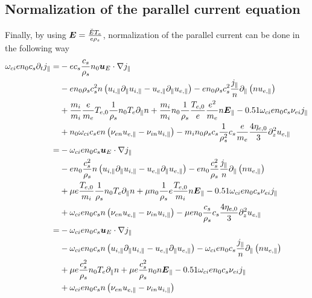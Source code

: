 \subsection{Normalization of the parallel current equation}
%
Finally, by using $\boldsymbol{E}=\frac{\breve{E}T_e}{e\rho_s}$, normalization of the parallel current can be done in the following way
%
\begin{align*}
 \om_{ci}en_0c_s
 \partial_t j_\|
 =&
 - e c_s \frac{c_s}{\rho_s}n_0
    \ve{u}_E \cdot \nabla j_\|
    \\&
    - e n_0\rho_s c_s^2
    n \L( u_{i, \|}  \partial_\| u_{i,\|} - u_{e, \|} \partial_\| u_{e,\|} \R)
    - e n_0\rho_s c_s^2
    \frac{j_\|}{n}\partial_\|\L(n u_{e,\|} \R)
    \\&
    + \frac{m_i}{m_i} \frac{e}{m_e}T_{e,0}\frac{1}{\rho_s}n_0
    T_e\partial_\| n
    + \frac{m_i}{m_i}n_0 \frac{1}{\rho_s}\frac{T_{e,0}}{e}\frac{e^2}{m_e}
    n\ve{E}_\|
    - 0.51 \om_{ci}en_0c_s
    \nu_{ei} j_\|
    \\ &
    + n_0\om_{ci}c_s e
    n \L(\nu_{e n}u_{e,\|}-\nu_{i n}u_{i,\|} \R)
    - m_in_0\rho_s c_s\frac{1}{\rho_s^2}c_s
    \frac{e}{m_e} \frac{4\eta_{e,0}}{3} \partial_z^2 u_{e,\|}
 \\
 =&
 - \om_{ci}en_0c_s
 \ve{u}_E \cdot \nabla j_\|
    \\&
    - e n_0\frac{c_s^2}{\rho_s}
    n \L( u_{i, \|}  \partial_\| u_{i,\|} - u_{e, \|} \partial_\| u_{e,\|} \R)
    - e n_0\frac{c_s^2}{\rho_s}
    \frac{j_\|}{n}\partial_\|\L(n u_{e,\|} \R)
    \\&
    + \mu e \frac{T_{e,0}}{m_i}\frac{1}{\rho_s}n_0
    T_e\partial_\| n
    + \mu n_0 \frac{1}{\rho_s}e\frac{T_{e,0}}{m_i}
    n\ve{E}_\|
    - 0.51 \om_{ci}en_0c_s
    \nu_{ei} j_\|
    \\ &
    + \om_{ci}en_0c_s
    n \L(\nu_{e n}u_{e,\|}-\nu_{i n}u_{i,\|} \R)
    - \mu e n_0 \frac{c_s}{\rho_s}c_s
     \frac{4\eta_{e,0}}{3} \partial_z^2 u_{e,\|}
 \\
 =&
 - \om_{ci}en_0c_s
    \ve{u}_E \cdot \nabla j_\|
    \\&
    - \om_{ci}en_0c_s
    n \L( u_{i, \|}  \partial_\| u_{i,\|} - u_{e, \|} \partial_\| u_{e,\|} \R)
    - \om_{ci}en_0c_s
    \frac{j_\|}{n}\partial_\|\L(n u_{e,\|} \R)
    \\&
    + \mu e \frac{c_s^2}{\rho_s}n_0
    T_e\partial_\| n
    + \mu e \frac{c_s^2}{\rho_s}n_0
    n\ve{E}_\|
    - 0.51 \om_{ci}en_0c_s
    \nu_{ei} j_\|
    \\ &
    + \om_{ci}en_0c_s
    n \L(\nu_{e n}u_{e,\|}-\nu_{i n}u_{i,\|} \R)

\end{align*}

